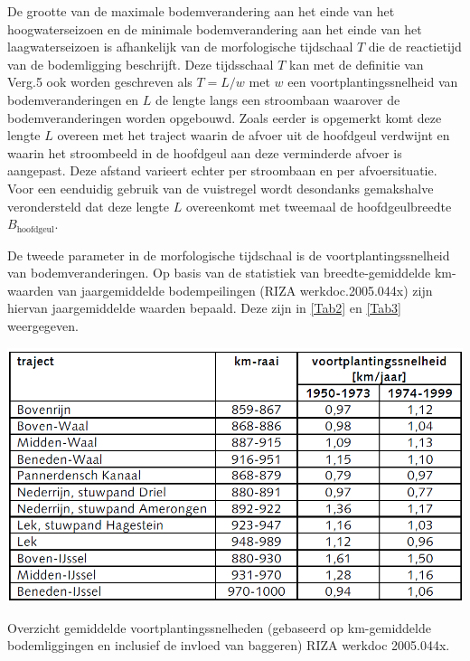 De grootte van de maximale bodemverandering aan het einde van het hoogwaterseizoen en de minimale bodemverandering aan het einde van het
laagwaterseizoen is afhankelijk van de morfologische tijdschaal $T$  die de reactietijd van de bodemligging beschrijft.
Deze tijdsschaal $T$ kan met de definitie van Verg.5 ook worden geschreven als $T=L/w$ met $w$ een voortplantingssnelheid van bodemveranderingen en $L$ de lengte langs een stroombaan waarover de bodemveranderingen worden opgebouwd.
Zoals eerder is opgemerkt komt deze lengte $L$ overeen met het traject waarin de afvoer uit de hoofdgeul verdwijnt en waarin het
stroombeeld in de hoofdgeul aan deze verminderde afvoer is aangepast.
Deze afstand varieert echter per stroombaan en per afvoersituatie.
Voor een eenduidig gebruik van de vuistregel wordt desondanks gemakshalve verondersteld dat deze lengte $L$ overeenkomt met tweemaal de hoofdgeulbreedte $B_\text{hoofdgeul}$.

De tweede parameter in de morfologische tijdschaal is de voortplantingssnelheid van bodemveranderingen.
Op basis van de statistiek van breedte-gemiddelde km-waarden van jaargemiddelde bodempeilingen (RIZA werkdoc.2005.044x) zijn hiervan
jaargemiddelde waarden bepaald.
Deze zijn in \autoref{Tab2} en \autoref{Tab3} weergegeven.

\begin{table}
\includegraphics[width=\columnwidth]{figures/Tab2.png}
\caption{Overzicht gemiddelde voortplantingssnelheden (gebaseerd op km-gemiddelde bodemliggingen en inclusief de invloed van baggeren) RIZA werkdoc 2005.044x.}
\label{Tab2Again}
\end{table}


